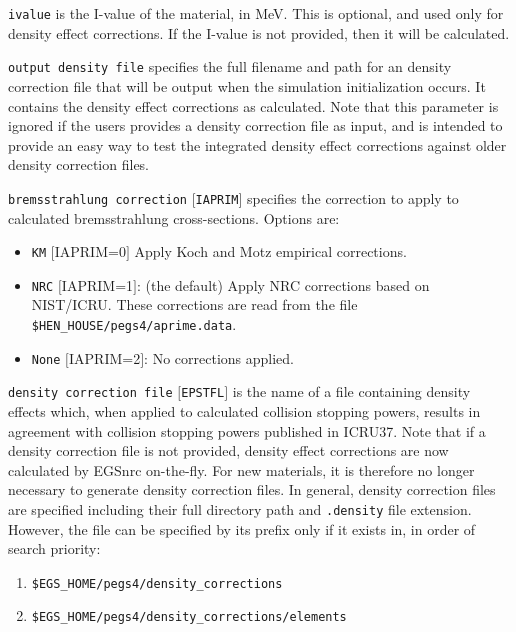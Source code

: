 \documentclass[12pt,twoside]{article}  %
\begin{document}
\begin{description}
\begin{description}
\item {\tt ivalue} is the I-value of the material, in MeV. This is optional, and used only for density effect corrections. If the I-value is not provided, then it will be calculated.
\item {\tt output density file} specifies the full filename and path for an density correction file that will be output when the simulation initialization occurs. It contains the density effect corrections as calculated. Note that this parameter is ignored if the users provides a density correction file as input, and is intended to provide an easy way to test the integrated density effect corrections against older density correction files.
\item {\tt bremsstrahlung correction} $[${\tt IAPRIM}$]$ specifies the
correction to apply to calculated bremsstrahlung cross-sections.
Options are:
\begin{itemize}
\item {\tt KM} $[$IAPRIM=0$]$ Apply Koch and Motz\cite{KM59} empirical corrections.
\item {\tt NRC} $[$IAPRIM=1$]$: (the default) Apply NRC corrections based on NIST/ICRU\cite{Ro89a}.  These corrections are read from the file
{\tt \$HEN\_HOUSE/pegs4/aprime.data}.
\item {\tt None} $[$IAPRIM=2$]$: No corrections applied.
\end{itemize}
\item {\tt density correction file} $[${\tt EPSTFL}$]$ is the name of a file containing density effects which, when applied to calculated collision
stopping powers, results in agreement with collision stopping powers published in ICRU37\cite{ICRU37}.
Note that if a density correction file is not provided, density effect corrections are now calculated by EGSnrc on-the-fly. For new materials, it is therefore no longer necessary to generate density correction files.
In general, density correction files are specified including their full directory path and {\tt .density} file extension.  However,
the file can be specified by its prefix only if it
exists in, in order of search priority:
\begin{enumerate}
\item {\tt \$EGS\_HOME/pegs4/density\_corrections}
\item {\tt \$EGS\_HOME/pegs4/density\_corrections/elements}

\end{enumerate}
\end{description}
\end{description}
\end{document}
